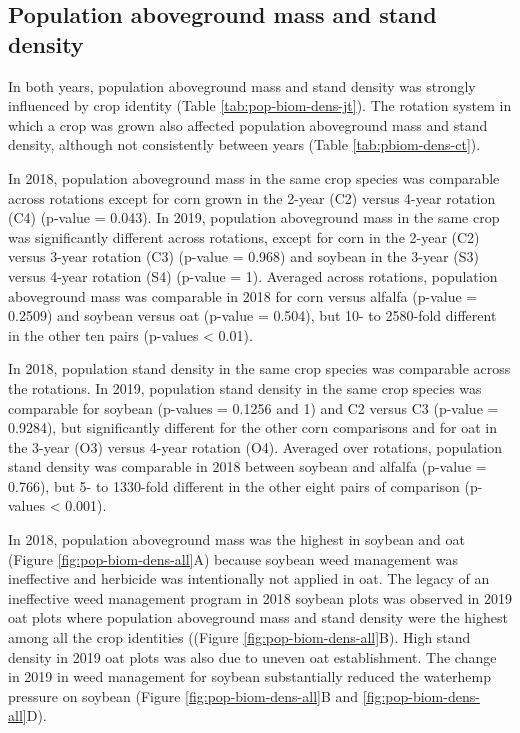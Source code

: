 \documentclass[
]{article}
\author{}
\date{\vspace{-2.5em}}
\begin{document}
\hypertarget{population-aboveground-mass-and-stand-density}{%
\subsection*{Population aboveground mass and stand density}\label{population-aboveground-mass-and-stand-density}}

In both years, population aboveground mass and stand density was strongly influenced by crop identity (Table \ref{tab:pop-biom-dens-jt}). The rotation system in which a crop was grown also affected population aboveground mass and stand density, although not consistently between years (Table \ref{tab:pbiom-dens-ct}).

In 2018, population aboveground mass in the same crop species was comparable across rotations except for corn grown in the 2-year (C2) versus 4-year rotation (C4) (p-value = 0.043). In 2019, population aboveground mass in the same crop was significantly different across rotations, except for corn in the 2-year (C2) versus 3-year rotation (C3) (p-value = 0.968) and soybean in the 3-year (S3) versus 4-year rotation (S4) (p-value = 1). Averaged across rotations, population aboveground mass was comparable in 2018 for corn versus alfalfa (p-value = 0.2509) and soybean versus oat (p-value = 0.504), but 10- to 2580-fold different in the other ten pairs (p-values \textless{} 0.01).

In 2018, population stand density in the same crop species was comparable across the rotations. In 2019, population stand density in the same crop species was comparable for soybean (p-values = 0.1256 and 1) and C2 versus C3 (p-value = 0.9284), but significantly different for the other corn comparisons and for oat in the 3-year (O3) versus 4-year rotation (O4). Averaged over rotations, population stand density was comparable in 2018 between soybean and alfalfa (p-value = 0.766), but 5- to 1330-fold different in the other eight pairs of comparison (p-values \textless{} 0.001).

In 2018, population aboveground mass was the highest in soybean and oat (Figure \ref{fig:pop-biom-dens-all}A) because soybean weed management was ineffective and herbicide was intentionally not applied in oat. The legacy of an ineffective weed management program in 2018 soybean plots was observed in 2019 oat plots where population aboveground mass and stand density were the highest among all the crop identities ((Figure \ref{fig:pop-biom-dens-all}B). High stand density in 2019 oat plots was also due to uneven oat establishment. The change in 2019 in weed management for soybean substantially reduced the waterhemp pressure on soybean (Figure \ref{fig:pop-biom-dens-all}B and \ref{fig:pop-biom-dens-all}D).
\end{document}
